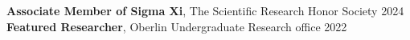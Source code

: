 \entryItem
  {{\bf Associate Member of Sigma Xi}, The Scientific Research Honor Society}
  {2024}
\entryItem
  {{\bf Featured Researcher}, Oberlin Undergraduate Research office}
  {2022}
